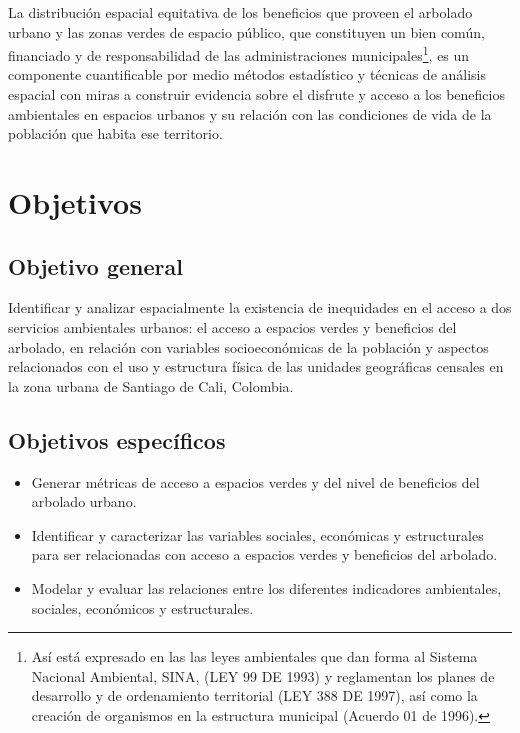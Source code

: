 \documentclass[12pt,]{book}
\providecommand{\tightlist}{%
  \setlength{\itemsep}{0pt}\setlength{\parskip}{0pt}}
\let\rmarkdownfootnote\footnote%
\def\footnote{\protect\rmarkdownfootnote}
\begin{document}
La distribución espacial equitativa de los beneficios que proveen el
arbolado urbano y las zonas verdes de espacio público, que constituyen
un bien común, financiado y de responsabilidad de las administraciones
municipales\footnote{Así está expresado en las las leyes ambientales que
  dan forma al Sistema Nacional Ambiental, SINA, (LEY 99 DE 1993) y
  reglamentan los planes de desarrollo y de ordenamiento territorial
  (LEY 388 DE 1997), así como la creación de organismos en la estructura
  municipal (Acuerdo 01 de 1996).}, es un componente cuantificable por
medio métodos estadístico y técnicas de análisis espacial con miras a
construir evidencia sobre el disfrute y acceso a los beneficios
ambientales en espacios urbanos y su relación con las condiciones de
vida de la población que habita ese territorio.

\section{Objetivos}\label{objetivos}

\subsection{Objetivo general}\label{objetivo-general}

Identificar y analizar espacialmente la existencia de inequidades en el
acceso a dos servicios ambientales urbanos: el acceso a espacios verdes
y beneficios del arbolado, en relación con variables socioeconómicas de
la población y aspectos relacionados con el uso y estructura física de
las unidades geográficas censales en la zona urbana de Santiago de Cali,
Colombia.

\subsection{Objetivos específicos}\label{objetivos-especificos}

\begin{itemize}
\tightlist
\item
  Generar métricas de acceso a espacios verdes y del nivel de beneficios
  del arbolado urbano.
\item
  Identificar y caracterizar las variables sociales, económicas y
  estructurales para ser relacionadas con acceso a espacios verdes y
  beneficios del arbolado.
\item
  Modelar y evaluar las relaciones entre los diferentes indicadores
  ambientales, sociales, económicos y estructurales.
\end{itemize}
\end{document}
